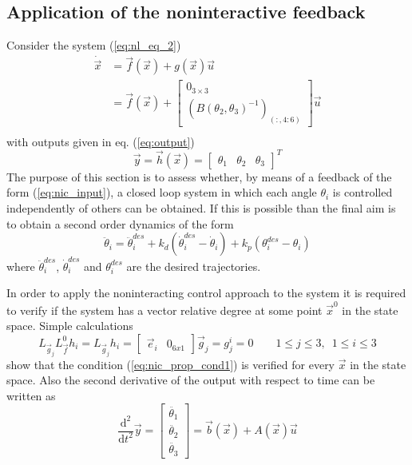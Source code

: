 \subsection{Application of the noninteractive feedback}
Consider the system (\ref{eq:nl_eq_2})
\[
\begin{split}
  \dot{\vec{x}} &= \vec{f}(\vec{x}) + g(\vec{x})\vec{u}\\
  &=\vec{f}(\vec{x}) +
  \begin{bmatrix}
    0_{3\times3} \\
    \left(B(\theta_2,\theta_3) ^ {-1}\right)_{(:, 4:6)}
  \end{bmatrix}\vec{u}\\
\end{split}
\]
with outputs given in eq. (\ref{eq:output})
\[
\vec{y} = \vec{h}(\vec{x}) =
\begin{bmatrix}
  \theta_1 &
  \theta_2 &
  \theta_3
\end{bmatrix}^T
\]
The purpose of this section is to assess whether, by means of a feedback of the form
(\ref{eq:nic_input}), a closed loop system in which each angle $\theta_i$ is controlled
independently of others can be obtained. If this is possible than the final aim is to obtain
a second order dynamics of the form
\begin{equation}\label{eq:des_dynamics}
\ddot{\theta}_{i} = \ddot{\theta}^{des}_{i} + k_d (\dot{\theta}^{des}_{i} - \dot{\theta}_{i}) + k_p (\theta^{des}_{i} - \theta_{i})
\end{equation}
where $\ddot{\theta}^{des}_{i}$, $\dot{\theta}^{des}_{i}$ and $\theta^{des}_{i}$ are
the desired trajectories.
\par
In order to apply the noninteracting control approach to the system it is required to
verify if the system has a vector relative degree at some point $\vec{x}^0$ in the state space.
Simple calculations
\[
L_{\vec{g}_{j}}L_{\vec{f}}^{0}h_{i} =
L_{\vec{g}_{j}}h_{i} = 
\begin{bmatrix}
  \vec{e}_i & 0_{6x1}
\end{bmatrix}
\vec{g}_j
=
g_{j}^{i} = 0
\qquad 1 \le j \le 3, \enspace 1 \le i \le 3
\]
show that the condition (\ref{eq:nic_prop_cond1}) is verified for every $\vec{x}$ in the state space.
Also the second derivative of the output with respect to time can be written as
\[
\frac{\mathrm{d}^{2}}{\mathrm{d}t^{2}}\vec{y} = 
\begin{bmatrix}
  \ddot{\theta_1}\\
  \ddot{\theta_2}\\
  \ddot{\theta_3}
\end{bmatrix} =
\vec{b}(\vec{x}) + A(\vec{x}) \vec{u}
\]

